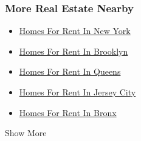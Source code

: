 \hypertarget{more-real-estate-nearby}{%
\subsubsection{More Real Estate Nearby}\label{more-real-estate-nearby}}

\begin{itemize}
\tightlist
\item
  \href{/real-estate/usa/ny/new-yorknew-york-ny-usa/homes-for-rent}{Homes
  For Rent In New York}
\item
  \href{/real-estate/usa/ny/brooklynbrooklyn-ny-usa/homes-for-rent}{Homes
  For Rent In Brooklyn}
\item
  \href{/real-estate/usa/ny/queensqueens-ny-usa/homes-for-rent}{Homes
  For Rent In Queens}
\item
  \href{/real-estate/usa/nj/jersey-cityjersey-city-nj-usa/homes-for-rent}{Homes
  For Rent In Jersey City}
\item
  \href{/real-estate/usa/ny/bronxbronx-ny-usa/homes-for-rent}{Homes For
  Rent In Bronx}
\end{itemize}

Show More

